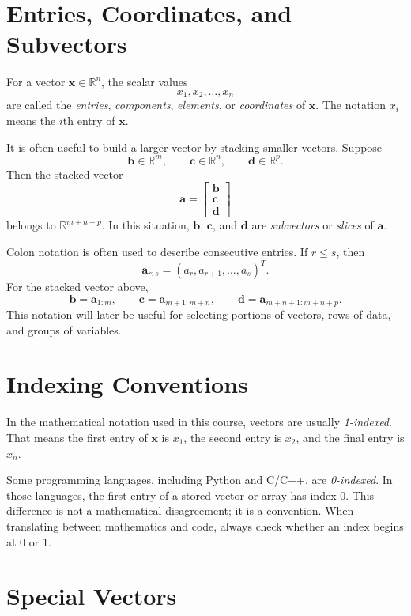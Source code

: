 \section{Entries, Coordinates, and Subvectors}
\label{mf:vector-entries-subvectors}

For a vector \(\mathbf{x}\in\mathbb{R}^n\), the scalar values
\[
 x_1,x_2,\ldots,x_n
\]
are called the \emph{entries}, \emph{components}, \emph{elements}, or \emph{coordinates} of \(\mathbf{x}\). The notation \(x_i\) means the \(i\)th entry of \(\mathbf{x}\).

It is often useful to build a larger vector by stacking smaller vectors. Suppose
\[
\mathbf{b}\in\mathbb{R}^m,
\qquad
\mathbf{c}\in\mathbb{R}^n,
\qquad
\mathbf{d}\in\mathbb{R}^p.
\]
Then the stacked vector
\[
\mathbf{a}
=
\begin{bmatrix}
\mathbf{b} \\
\mathbf{c} \\
\mathbf{d}
\end{bmatrix}
\]
belongs to \(\mathbb{R}^{m+n+p}\). In this situation, \(\mathbf{b}\), \(\mathbf{c}\), and \(\mathbf{d}\) are \emph{subvectors} or \emph{slices} of \(\mathbf{a}\).

Colon notation is often used to describe consecutive entries. If \(r\leq s\), then
\[
\mathbf{a}_{r:s} = (a_r,a_{r+1},\ldots,a_s)^T.
\]
For the stacked vector above,
\[
\mathbf{b}=\mathbf{a}_{1:m},
\qquad
\mathbf{c}=\mathbf{a}_{m+1:m+n},
\qquad
\mathbf{d}=\mathbf{a}_{m+n+1:m+n+p}.
\]
This notation will later be useful for selecting portions of vectors, rows of data, and groups of variables.

\section{Indexing Conventions}
\label{mf:vector-indexing}

In the mathematical notation used in this course, vectors are usually \emph{1-indexed}. That means the first entry of \(\mathbf{x}\) is \(x_1\), the second entry is \(x_2\), and the final entry is \(x_n\).

Some programming languages, including Python and C/C++, are \emph{0-indexed}. In those languages, the first entry of a stored vector or array has index 0. This difference is not a mathematical disagreement; it is a convention. When translating between mathematics and code, always check whether an index begins at 0 or 1.

\section{Special Vectors}
\label{mf:special-vectors}

